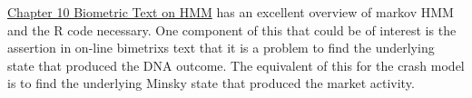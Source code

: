 \documentclass[12pt, a4paper, oneside]{article} %
\begin{document}
\href{http://a-little-book-of-r-for-bioinformatics.readthedocs.org/en/latest/src/chapter10.html}{Chapter 10 Biometric Text on HMM}
has an excellent overview of markov HMM and the R code necessary. One component of this that could be of interest is the assertion in on-line bimetrixs text that it is a problem to find the underlying state that produced the DNA outcome.  The equivalent of this for the crash model is to find the underlying Minsky state that produced the market activity.


\end{document}
